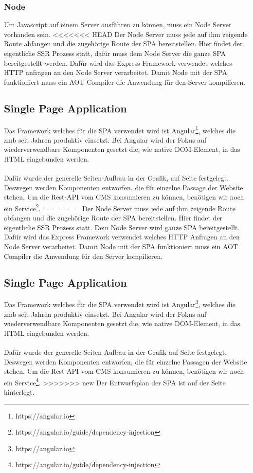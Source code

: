 \documentclass[11pt,a4paper]{article}
\begin{document}
\subsubsection{Node}
Um Javascript auf einem Server ausführen zu können, muss ein Node Server vorhanden sein.
<<<<<<< HEAD
Der Node Server muss jede auf ihm zeigende Route abfangen und die zugehörige Route der SPA bereitstellen. Hier findet der eigentliche SSR Prozess statt, dafür muss dem Node Server die ganze SPA bereitgestellt werden. Dafür wird das Express Framework verwendet welches HTTP anfragen an den Node Server verarbeitet. Damit Node mit der SPA funktioniert muss ein \acs{AOT} Compiler die Anwendung für den Server kompilieren.
\subsection{Single Page Application}
Das Framework welches für die SPA verwendet wird ist Angular\footnote{https://angular.io}, welches die zmb seit Jahren produktiv einsetzt. Bei Angular wird der Fokus auf wiederverwendbare Komponenten gesetzt die, wie native DOM-Element, in das HTML eingebunden werden.\\\\
Dafür wurde der generelle Seiten-Aufbau in der Grafik, auf Seite \pageref{sec:epage}
festgelegt. Deswegen werden Komponenten entworfen, die für einzelne Passage der Website stehen.
Um die Rest-API vom CMS  konsumieren zu können, benötigen wir noch ein Service\footnote{https://angular.io/guide/dependency-injection}.
=======
Der Node Server muss jede auf ihm zeigende Route abfangen und die zugehörige Route der SPA bereitstellen. Hier findet der eigentliche SSR Prozess statt. Dem Node Server wird ganze SPA bereitgestellt. Dafür wird das Express Framework verwendet welches HTTP Anfragen an den Node Server verarbeitet. Damit Node mit der SPA funktioniert muss ein \acs{AOT} Compiler die Anwendung für den Server kompilieren.
\subsection{Single Page Application}
Das Framework welches für die SPA verwendet wird ist Angular\footnote{https://angular.io}, welches die zmb seit Jahren produktiv einsetzt. Bei Angular wird der Fokus auf wiederverwendbare Komponenten gesetzt die, wie native DOM-Element, in das HTML eingebunden werden.\\\\
Dafür wurde der generelle Seiten-Aufbau in der Grafik auf Seite \pageref{sec:epage} 
festgelegt. Deswegen werden Komponenten entworfen, die für einzelne Passagen der Website stehen. 
Um die Rest-API vom CMS konsumieren zu können, benötigen wir noch ein Service\footnote{https://angular.io/guide/dependency-injection}. 
>>>>>>> new
Der Entwurfsplan der SPA ist auf der Seite \pageref{sec:espa} hinterlegt.
\end{document}
